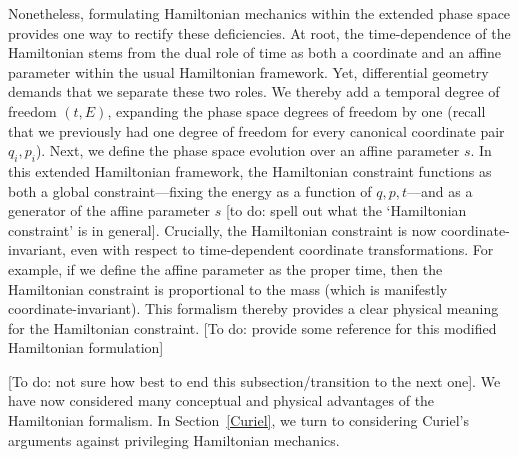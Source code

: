 \documentclass[letterpaper]{article}
\begin{document}
Nonetheless, formulating Hamiltonian mechanics within the extended phase space provides one way to rectify these deficiencies. At root, the time-dependence of the Hamiltonian stems from the dual role of time as both a coordinate and an affine parameter within the usual Hamiltonian framework. Yet, differential geometry demands that we separate these two roles. We thereby add a temporal degree of freedom $(t, E) $, expanding the phase space degrees of freedom by one (recall that we previously had one degree of freedom for every canonical coordinate pair $q_i, p_i$). Next, we define the phase space evolution over an affine parameter $s $. In this extended Hamiltonian framework, the Hamiltonian constraint functions as both a global constraint---fixing the energy as a function of $q, p, t $---and as a generator of the affine parameter $s $ [to do: spell out what the `Hamiltonian constraint' is in general]. Crucially, the Hamiltonian constraint is now coordinate-invariant, even with respect to time-dependent coordinate transformations. For example, if we define the affine parameter as the proper time, then the Hamiltonian constraint is proportional to the mass (which is manifestly coordinate-invariant). This formalism thereby provides a clear physical meaning for the Hamiltonian constraint. [To do: provide some reference for this modified Hamiltonian formulation]


[To do: not sure how best to end this subsection/transition to the next one]. We have now considered many conceptual and physical advantages of the Hamiltonian formalism. In Section~\ref{Curiel}, we turn to considering Curiel's \parencites*[]{Curiel} arguments against privileging Hamiltonian mechanics. 
\end{document}
